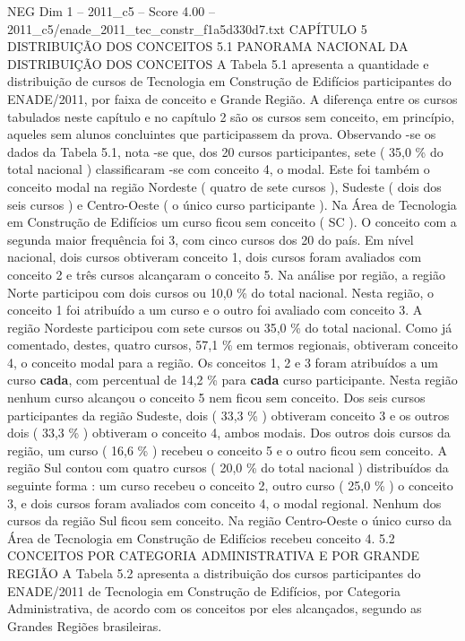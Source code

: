 \begin{textsample}{NEG Dim 1 – 2011\_c5 – Score 4.00 – 2011\_c5/enade\_2011\_tec\_constr\_f1a5d330d7.txt}  \label{ex:f1_neg_318}
CAPÍTULO 5 DISTRIBUIÇÃO DOS CONCEITOS 5.1 PANORAMA NACIONAL DA DISTRIBUIÇÃO DOS CONCEITOS A Tabela 5.1 apresenta a quantidade e distribuição de cursos de Tecnologia em Construção de Edifícios participantes do ENADE/2011, por faixa de conceito e Grande Região.
A diferença entre os cursos tabulados neste capítulo e no capítulo 2 são os cursos sem conceito, em princípio, aqueles sem alunos concluintes que participassem da prova.
Observando -se os dados da Tabela 5.1, nota -se que, dos 20 cursos participantes, sete ( 35,0 \% do total nacional ) classificaram -se com conceito 4, o modal.
Este foi também o conceito modal na região Nordeste ( quatro de sete cursos ), Sudeste ( dois dos seis cursos ) e Centro-Oeste ( o único curso participante ).
Na Área de Tecnologia em Construção de Edifícios um curso ficou sem conceito ( SC ).
O conceito com a segunda maior frequência foi 3, com cinco cursos dos 20 do país.
Em nível nacional, dois cursos obtiveram conceito 1, dois cursos foram avaliados com conceito 2 e três cursos alcançaram o conceito 5.
Na análise por região, a região Norte participou com dois cursos ou 10,0 \% do total nacional.
Nesta região, o conceito 1 foi atribuído a um curso e o outro foi avaliado com conceito 3.
A região Nordeste participou com sete cursos ou 35,0 \% do total nacional.
Como já comentado, destes, quatro cursos, 57,1 \% em termos regionais, obtiveram conceito 4, o conceito modal para a região.
Os conceitos 1, 2 e 3 foram atribuídos a um curso \textbf{cada}, com percentual de 14,2 \% para \textbf{cada} curso participante.
Nesta região nenhum curso alcançou o conceito 5 nem ficou sem conceito.
Dos seis cursos participantes da região Sudeste, dois ( 33,3 \% ) obtiveram conceito 3 e os outros dois ( 33,3 \% ) obtiveram o conceito 4, ambos modais.
Dos outros dois cursos da região, um curso ( 16,6 \% ) recebeu o conceito 5 e o outro ficou sem conceito.
A região Sul contou com quatro cursos ( 20,0 \% do total nacional ) distribuídos da seguinte forma : um curso recebeu o conceito 2, outro curso ( 25,0 \% ) o conceito 3, e dois cursos foram avaliados com conceito 4, o modal regional.
Nenhum dos cursos da região Sul ficou sem conceito.
Na região Centro-Oeste o único curso da Área de Tecnologia em Construção de Edifícios recebeu conceito 4. 5.2 CONCEITOS POR CATEGORIA ADMINISTRATIVA E POR GRANDE REGIÃO A Tabela 5.2 apresenta a distribuição dos cursos participantes do ENADE/2011 de Tecnologia em Construção de Edifícios, por Categoria Administrativa, de acordo com os conceitos por eles alcançados, segundo as Grandes Regiões brasileiras.

\end{textsample}
